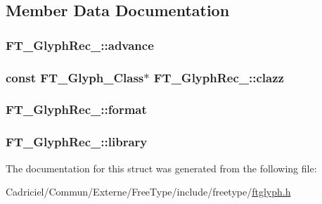 \subsection{Member Data Documentation}
\hypertarget{struct_f_t___glyph_rec___afd95b047df6a249db79018a279137018}{
\subsubsection[{advance}]{ F\-T\-\_\-\-Glyph\-Rec\-\_\-\-::advance}}\label{struct_f_t___glyph_rec___afd95b047df6a249db79018a279137018}
\hypertarget{struct_f_t___glyph_rec___ad7074cfe0e9fd6616e4dc4011e481524}{
\subsubsection[{clazz}]{\setlength{\rightskip}{0pt plus 5cm}const {\bf F\-T\-\_\-\-Glyph\-\_\-\-Class}$\ast$ F\-T\-\_\-\-Glyph\-Rec\-\_\-\-::clazz}}\label{struct_f_t___glyph_rec___ad7074cfe0e9fd6616e4dc4011e481524}
\hypertarget{struct_f_t___glyph_rec___a26b42a2610a69dcaed3e7c8b6d506211}{
\subsubsection[{format}]{ F\-T\-\_\-\-Glyph\-Rec\-\_\-\-::format}}\label{struct_f_t___glyph_rec___a26b42a2610a69dcaed3e7c8b6d506211}
\hypertarget{struct_f_t___glyph_rec___a00679b5e2519affab0f3999718817f8e}{
\subsubsection[{library}]{ F\-T\-\_\-\-Glyph\-Rec\-\_\-\-::library}}\label{struct_f_t___glyph_rec___a00679b5e2519affab0f3999718817f8e}


The documentation for this struct was generated from the following file\-:\begin{DoxyCompactItemize}
\item 
Cadriciel/\-Commun/\-Externe/\-Free\-Type/include/freetype/\hyperlink{ftglyph_8h}{ftglyph.\-h}\end{DoxyCompactItemize}
